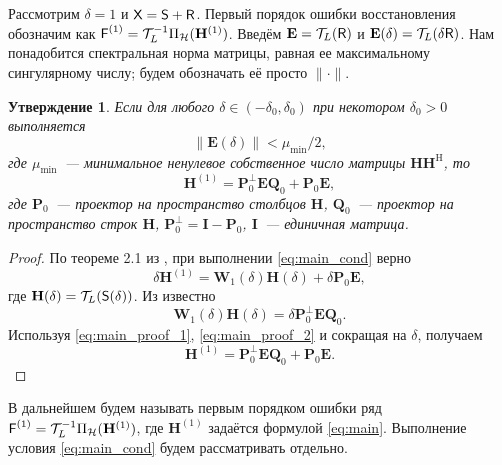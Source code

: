 \documentclass[specialist,
               substylefile = spbu.rtx,
               subf,href,colorlinks=true, 12pt]{disser}
\newtheorem{statement}{Утверждение}
\begin{document}
Рассмотрим $\delta = 1$ и $\textsf{X} = \textsf{S} + \textsf{R}$. Первый порядок ошибки восстановления обозначим как $\textsf{F}^{(1)} = \mathcal{T}_L^{-1} \Pi_{\mathcal{H}}(\mathbf{H}^{(1)})$. Введём $\mathbf{E} = \mathcal{T}_L(\textsf{R})$ и $\mathbf{E}(\delta) = \mathcal{T}_L(\delta \textsf{R})$. Нам понадобится спектральная норма матрицы, равная ее максимальному сингулярному числу; будем обозначать её просто $\|\cdot\|$.

\begin{statement} \label{st:main}
	Если для любого $\delta \in (-\delta_0, \delta_0)$ при некотором $\delta_0>0$ выполняется
	\begin{equation} \label{eq:main_cond}
		\|\mathbf{E}(\delta)\| < \mu_{\min} / 2,
	\end{equation}
	где $\mu_{\min}$~--- минимальное ненулевое собственное число матрицы $\mathbf{H}\mathbf{H}^\mathrm{H}$, то
\begin{equation} \label{eq:main}
	\mathbf{H}^{(1)} = \mathbf{P}^{\perp}_0 \mathbf{E} \mathbf{Q}_0 + \mathbf{P}_0 \mathbf{E},
\end{equation}
где $\mathbf{P}_0$~--- проектор на пространство столбцов $\mathbf{H}$, $\mathbf{Q}_0$~--- проектор на пространство строк $\mathbf{H}$, $\mathbf{P}^{\perp}_0 = \mathbf{I} - \mathbf{P}_0$, $\mathbf{I}$~--- единичная матрица.
\end{statement}
\begin{proof}
	
По теореме 2.1 из \cite{Nekrutkin}, при выполнении \eqref{eq:main_cond} верно
\begin{equation} \label{eq:main_proof_1}
\delta\mathbf{H}^{(1)} = \mathbf{W}_1(\delta) \mathbf{H}(\delta) + \delta \mathbf{P}_0 \mathbf{E},
\end{equation}
где $\mathbf{H}(\delta) = \mathcal{T}_L(\textsf{S}(\delta))$.
Из \cite[стр.12]{Konstantinov} известно
\begin{equation} \label{eq:main_proof_2}
	\mathbf{W}_1(\delta) \mathbf{H}(\delta) = \delta \mathbf{P}^{\perp}_0 \mathbf{E} \mathbf{Q}_0.
\end{equation}
Используя \eqref{eq:main_proof_1}, \eqref{eq:main_proof_2} и сокращая на $\delta$, получаем
\begin{equation*}
	\mathbf{H}^{(1)} = \mathbf{P}^{\perp}_0 \mathbf{E} \mathbf{Q}_0 + \mathbf{P}_0 \mathbf{E}.
\end{equation*}
\end{proof}

В дальнейшем будем называть первым порядком ошибки ряд $\textsf{F}^{(1)} = \mathcal{T}_L^{-1} \Pi_{\mathcal{H}}(\mathbf{H}^{(1)})$, где $\mathbf{H}^{(1)}$ задаётся формулой \eqref{eq:main}. Выполнение условия \eqref{eq:main_cond} будем рассматривать отдельно.
\end{document}
